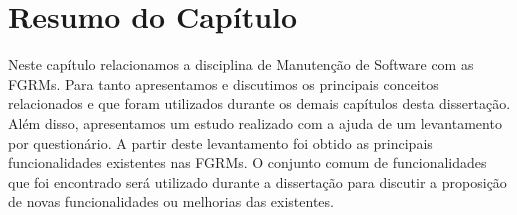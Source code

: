 \section{Resumo do Capítulo}
\label{sec:resumo_do_capitulo}

Neste capítulo relacionamos a disciplina de Manutenção de Software com as FGRMs.
Para tanto apresentamos e discutimos os principais conceitos relacionados e que
foram utilizados durante os demais capítulos desta dissertação. Além disso,
apresentamos um estudo realizado com a ajuda de um levantamento por
questionário. A partir deste levantamento foi obtido as principais
funcionalidades existentes nas FGRMs. O conjunto comum de funcionalidades que
foi encontrado será utilizado durante a dissertação para discutir a proposição
de novas funcionalidades ou melhorias das existentes.
